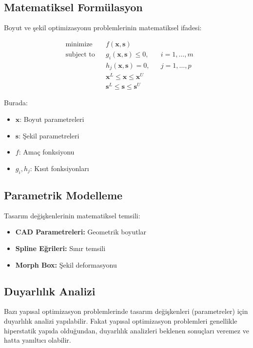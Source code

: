
\subsection{Matematiksel Formülasyon}
Boyut ve şekil optimizasyonu problemlerinin matematiksel ifadesi:

\begin{equation}
\begin{aligned}
& \text{minimize} & & f(\mathbf{x}, \mathbf{s}) \\
& \text{subject to} & & g_i(\mathbf{x}, \mathbf{s}) \leq 0, & & i = 1,\ldots,m \\
& & & h_j(\mathbf{x}, \mathbf{s}) = 0, & & j = 1,\ldots,p \\
& & & \mathbf{x}^L \leq \mathbf{x} \leq \mathbf{x}^U \\
& & & \mathbf{s}^L \leq \mathbf{s} \leq \mathbf{s}^U
\end{aligned}
\end{equation}

Burada:
\begin{itemize}
    \item \(\mathbf{x}\): Boyut parametreleri
    \item \(\mathbf{s}\): Şekil parametreleri
    \item \(f\): Amaç fonksiyonu
    \item \(g_i, h_j\): Kısıt fonksiyonları
\end{itemize}

\subsection{Parametrik Modelleme}
Tasarım değişkenlerinin matematiksel temsili:

\begin{itemize}
    \item \textbf{CAD Parametreleri:} Geometrik boyutlar
    \item \textbf{Spline Eğrileri:} Sınır temsili
    \item \textbf{Morph Box:} Şekil deformasyonu
\end{itemize}


\subsection{Duyarlılık Analizi}
Bazı yapısal optimizasyon problemlerinde tasarım değişkenleri (parametreler) için duyarlılık analizi yapılabilir. Fakat yapısal optimizasyon problemleri genellikle hiperstatik yapıda olduğundan, duyarlılık analizleri beklenen sonuçları veremez ve hatta yanıltıcı olabilir. 


